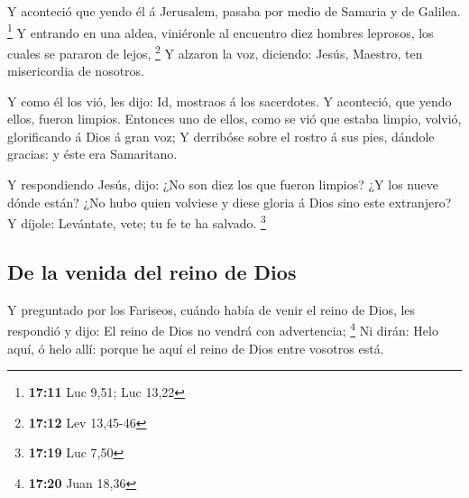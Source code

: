  Y aconteció que yendo él á Jerusalem, pasaba por medio
de Samaria y de Galilea. \footnote{\textbf{17:11} Luc 9,51; Luc 13,22}
 Y entrando en una aldea, viniéronle al encuentro diez
hombres leprosos, los cuales se pararon de lejos, \footnote{\textbf{17:12}
  Lev 13,45-46}  Y alzaron la voz, diciendo: Jesús,
Maestro, ten misericordia de nosotros.

 Y como él los vió, les dijo: Id, mostraos á los
sacerdotes. Y aconteció, que yendo ellos, fueron limpios.
 Entonces uno de ellos, como se vió que estaba limpio,
volvió, glorificando á Dios á gran voz;  Y derribóse
sobre el rostro á sus pies, dándole gracias: y éste era Samaritano.

 Y respondiendo Jesús, dijo: ¿No son diez los que fueron
limpios? ¿Y los nueve dónde están?  ¿No hubo quien
volviese y diese gloria á Dios sino este extranjero?  Y
díjole: Levántate, vete; tu fe te ha salvado. \footnote{\textbf{17:19}
  Luc 7,50}

\hypertarget{de-la-venida-del-reino-de-dios}{%
\subsection{De la venida del reino de
Dios}\label{de-la-venida-del-reino-de-dios}}

 Y preguntado por los Fariseos, cuándo había de venir el
reino de Dios, les respondió y dijo: El reino de Dios no vendrá con
advertencia; \footnote{\textbf{17:20} Juan 18,36}  Ni
dirán: Helo aquí, ó helo allí: porque he aquí el reino de Dios entre
vosotros está.

